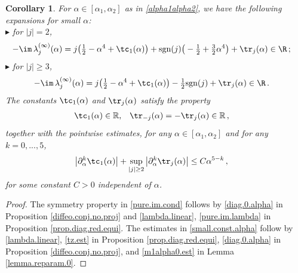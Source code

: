\documentclass[a4paper,reqno,10pt]{article}
\newtheorem{cor}{Corollary}[section]
\newcommand{\pa}{\partial}
\begin{document}
\begin{cor}\label{cor.eigen.asympt}
For $\alpha \in [\alpha_{1},\alpha_{2}]$ as in \eqref{alpha1alpha2},	we have the following expansions for small $\alpha$:
\\[1mm]
\noindent $\blacktriangleright$ for $|j|= 2$,
\begin{equation}
	\begin{aligned}
		-\im\,\lambda_{j}^{(\infty)}(\alpha) &= j \big(\tfrac12 - \alpha^4 +\tc_{1}(\alpha) \big) + {\rm sgn}(j) \big(-\tfrac12 + \tfrac{3}{2} \alpha^4\big) + \tr_{j}(\alpha) \in\R\,;
	\end{aligned}
\end{equation}
\noindent $\blacktriangleright$ for $|j|\geq 3$, 
\begin{equation}
	\begin{aligned}
		-\im\,\lambda_{j}^{(\infty)}(\alpha) &= j \big(\tfrac12 -  \alpha^4 +\tc_{1}(\alpha) \big) - \tfrac12 {\rm sgn}(j) + \tr_{j}(\alpha)  \in \R \,. 
	\end{aligned}
\end{equation}
The constants $\tc_{1}(\alpha)$ and $\tr_{j}(\alpha)$   satisfy  the property
\begin{equation}\label{pure.im.cond}
	\begin{aligned}
		\tc_{1}(\alpha)\in\mathbb{R},& \quad \tr_{-j}(\alpha) = -{\tr}_{j}(\alpha)\in\mathbb{R}\,,
	\end{aligned}
\end{equation}
together with the pointwise estimates, for any $\alpha \in [\alpha_{1},\alpha_{2}]$ and  for any $k=0,...,5$,
\begin{align}\label{small.const.alpha}
	\big| \pa_{\alpha}^k \tc_{1}(\alpha) \big|+\sup_{|j|\geq 2}\big| \pa_{\alpha}^k \tr_{j}(\alpha)\big| & \leq C \alpha^{5-k} \,, 
	\end{align}
for some constant $C>0$ independent of $\alpha$.
\end{cor}
\begin{proof}
	The symmetry property in \eqref{pure.im.cond} follows by \eqref{diag.0.alpha}  in Proposition \ref{diffeo.conj.no.proj} and \eqref{lambda.linear}, \eqref{pure.im.lambda} in Proposition \ref{prop.diag.red.equi}. The estimates in \eqref{small.const.alpha} follow by \eqref{lambda.linear}, \eqref{tz.est} in Proposition \ref{prop.diag.red.equi},  \eqref{diag.0.alpha}  in Proposition \ref{diffeo.conj.no.proj},  and \eqref{m1alpha0.est} in Lemma \ref{lemma.reparam.0}.
\end{proof}
\end{document}
